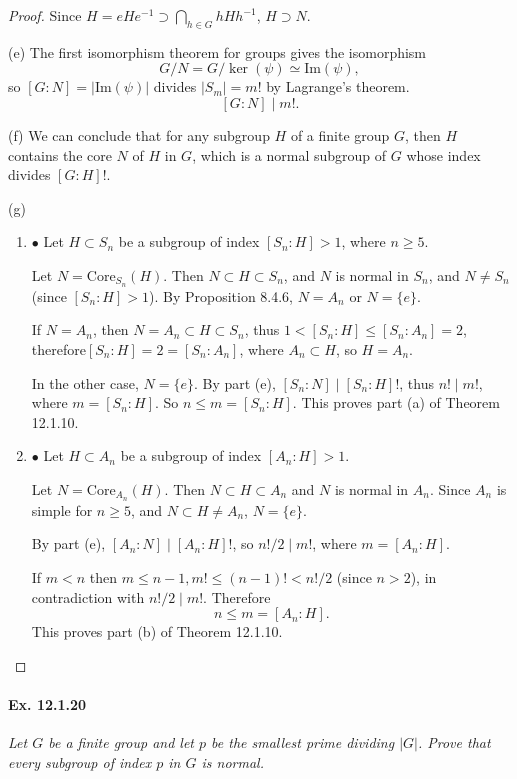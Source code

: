 \documentclass[11pt,a4paper]{article}
\newcommand{\be} {\begin{enumerate}}
\newcommand{\ee} {\end{enumerate}}
\begin{document}
\begin{proof}
Since $H = eHe^{-1} \supset \bigcap_{h\in G} hHh^{-1}$, $H\supset N$.

\item[(e)] The first isomorphism theorem for groups gives the isomorphism $$G/N = G/\ker(\psi) \simeq \mathrm{Im}(\psi),$$ so $[G:N] = |\mathrm{Im}(\psi)|$ divides $|S_m| = m!$ by Lagrange's theorem.
$$[G:N] \mid m!.$$

\item[(f)] We can conclude that for any subgroup $H$ of a finite group $G$, then $H$ contains the core $N$ of $H$ in $G$, which is a normal subgroup of $G$ whose index divides $[G:H]!$.

\item[(g)]
   \be \item[$\bullet$] Let $H \subset S_n$ be a subgroup of index $[S_n:H]>1$, where $n\geq 5$.
   
   Let $N = \mathrm{Core}_{S_n}(H)$. Then $N\subset H \subset S_n$, and $N$ is normal in $S_n$, and $N\ne S_n$ (since $[S_n:H]>1$). By Proposition 8.4.6, $N = A_n$ or $N=\{e\}$.
   
   If $N = A_n$, then $N=A_n \subset H \subset S_n$, thus $1< [S_n:H] \leq [S_n:A_n] = 2$, therefore$ [S_n:H] = 2 = [S_n:A_n]$, where $A_n \subset H$, so $H = A_n$.
   
   In the other case, $N = \{e\}$. By part (e), $[S_n : N] \mid [S_n:H]!$, thus $n! \mid m!$, where $m = [S_n:H]$. So $n\leq m =[S_n:H]$. This proves part (a) of Theorem 12.1.10.
   
   \item[$\bullet$] Let $H \subset A_n$ be a subgroup of index $[A_n:H]>1$.
   
   Let $N = \mathrm{Core}_{A_n}(H)$. Then $N \subset H \subset A_n$ and $N$ is normal in $A_n$. Since $A_n$ is simple for $n\geq 5$, and $N \subset H \ne A_n$, $N =\{e\}$.
   
   By part (e), $[A_n:N] \mid [A_n:H] !$, so $n!/2 \mid m!$, where $m = [A_n:H]$.
   
   If $m<n$ then $m \leq n-1, m! \leq (n-1)! < n!/2$ (since $n>2$), in contradiction with $n!/2 \mid m!$. Therefore 
   $$n \leq m = [A_n:H].$$
   This proves part (b) of Theorem 12.1.10.
   \ee
   \end{proof}
   
  
\paragraph{Ex. 12.1.20}

{\it Let $G$ be a finite group and let $p$ be the smallest prime dividing $|G|$. Prove that every subgroup of index $p$ in $G$ is normal.
}
\end{document}
